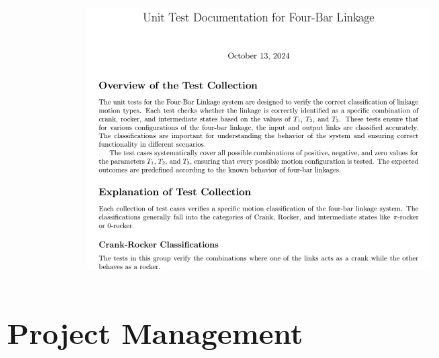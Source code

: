 \documentclass[ucs,10pt]{beamer}
\begin{document}
\begin{frame}
\begin{figure}
\begin{subfigure}[b]{0.45\textwidth}
			\includegraphics[width=\textwidth]{./Figures/Docs/Test.png}
		\end{subfigure}
	\end{figure}
\end{frame}

\section{Project Management}
\end{document}
